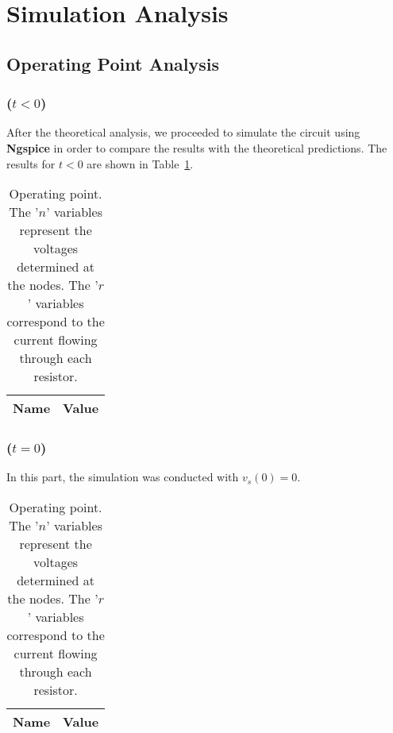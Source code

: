 \newpage

\section{Simulation Analysis}
\label{sec:simulation}

\subsection{Operating Point Analysis}
\label{sec:op_point}

\subsubsection{($t < 0$)}

After the theoretical analysis, we proceeded to simulate the circuit using {\bf Ngspice} in order to compare the results with the theoretical predictions. The results for $t < 0$ are shown in Table~\ref{tab:op1}.

\begin{table}[H]
	\centering
	\begin{tabular}{|l|c|}
		\hline    
		    {\bf Name} & {\bf Value} \\
                    \hline
                    \hline
		
	\end{tabular}
	\caption{Operating point. The '$n$' variables represent the voltages determined at the nodes. The '$r$' variables correspond to the current flowing through each resistor.}
	\label{tab:op1}
\end{table}

\subsubsection{($t = 0$)}

In this part, the simulation was conducted with $v_s(0) = 0$. 

\begin{table}[H]
	\centering
	\begin{tabular}{|l|c|}
		\hline    
		    {\bf Name} & {\bf Value} \\
                    \hline
                    \hline
		
	\end{tabular}
	\caption{Operating point. The '$n$' variables represent the voltages determined at the nodes. The '$r$' variables correspond to the current flowing through each resistor.}
	\label{tab:op2}
\end{table}

